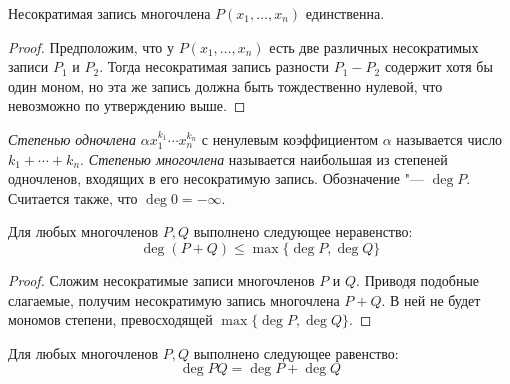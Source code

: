 \begin{corollary}
	Несократимая запись многочлена $P(x_1, \dotsc, x_n)$ единственна.
\end{corollary}

\begin{proof}
	Предположим, что у $P(x_1,\dots, x_n)$ есть две различных несократимых записи $P_1$ и $P_2$. Тогда несократимая запись разности $P_1 - P_2$ содержит хотя бы один моном, но эта же запись должна быть тождественно нулевой, что невозможно по утверждению выше.
\end{proof}

\begin{definition}
	\textit{Степенью одночлена} $\alpha x_1^{k_1} \dotsm x_n^{k_n}$ с ненулевым коэффициентом $\alpha$ называется число $k_1 + \dotsb + k_n$. \textit{Степенью многочлена} называется наибольшая из степеней одночленов, входящих в его несократимую запись. Обозначение "--- $\deg{P}$. Считается также, что $\deg{0} = -\infty$.
\end{definition}

\begin{proposition}
	Для любых многочленов $P, Q$ выполнено следующее неравенство:
	\[\deg{(P + Q)} \le \max\{\deg{P}, \deg{Q}\}\]
\end{proposition}

\begin{proof}
	Сложим несократимые записи многочленов $P$ и $Q$. Приводя подобные слагаемые, получим несократимую запись многочлена $P+Q$. В ней не будет мономов степени, превосходящей $\max\{\deg{P}, \deg{Q}\}$.
\end{proof}

\begin{proposition}
	Для любых многочленов $P, Q$ выполнено следующее равенство:
	\[\deg{PQ} = \deg{P} + \deg{Q}\]
\end{proposition}

